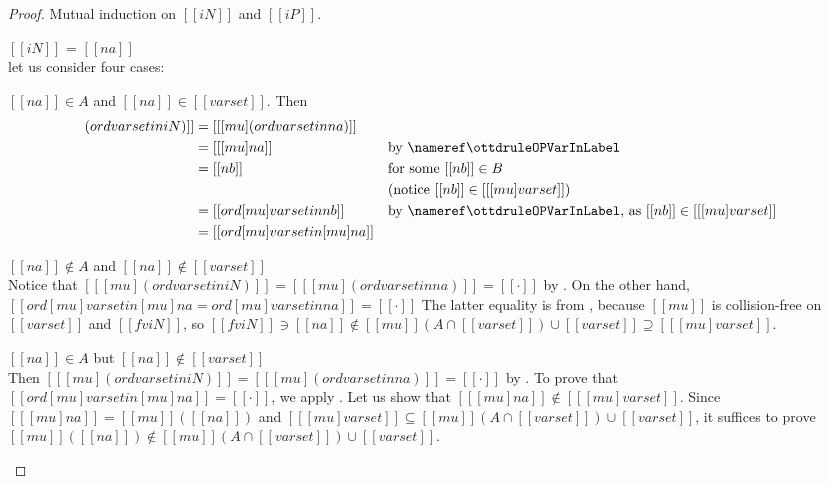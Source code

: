 \lemDistrMuOrd*
\begin{proof}
  Mutual induction on $[[iN]]$ and $[[iP]]$.
  \begin{caseof}
  \item $[[iN]]$ = $[[na]]$ \label{case:distr-mu-ord:var} \\
    let us consider four cases:
    \begin{caseof}
    \item $[[na]] \in A$ and $[[na]] \in [[varset]]$. Then
      \begin{align*} [[ [mu] (ord varset in iN) ]] &= [[ [mu] (ord varset in na)]] \\
                                                             &= [[ [mu] na ]]
                                                             && \text{by \ruleref{\ottdruleOPVarInLabel}}\\
                                                             &= [[nb]]
                                                             && \text{for some $[[nb]] \in B$}\\
                                                             & && \text{(notice $[[nb]] \in [[ [mu]varset ]]$)} \\
                                                             &= [[ ord [mu]varset in nb ]]
                                                             && \text{by \ruleref{\ottdruleOPVarInLabel},
                                                                as $[[nb]] \in [[ [mu]varset ]]$} \\
                                                             &= [[ord [mu] varset in [mu] na ]]
       \end{align*}
     \item $[[na]] \notin A$ and $[[na]] \notin [[varset]]$\\
       Notice that
       $[[ [mu] (ord varset in iN) ]] = [[ [mu] (ord varset in na)]] = [[·]]$ by
       .
       On the other hand, $[[ ord [mu] varset in [mu] na = ord [mu] varset
       in na ]] = [[·]]$ The latter equality is from
       , because
       $[[mu]]$ is collision-free on $[[varset]]$ and $[[fv iN]]$, so
       $[[fv iN]] \ni [[na]] \notin [[mu]](A \cap [[varset]]) \cup
       [[varset]] \supseteq [[ [mu] varset ]]$.
     \item $[[na]] \in A$ but $[[na]] \notin [[varset]]$\\ Then
       $[[ [mu] (ord varset in iN) ]] = [[ [mu] (ord varset in na)]] = [[·]]$
       by .
       To prove that\\ $[[ ord [mu] varset in [mu] na ]] = [[·]]$, we apply
       . Let us show that
       $[[ [mu] na ]] \notin [[ [mu] varset ]]$.
       Since $[[ [mu] na ]] = [[mu]]([[na]])$ and
       $[[ [mu] varset ]] \subseteq [[mu]](A \cap [[varset]]) \cup [[varset]]$,
       it suffices to prove 
       $[[mu]]([[na]]) \notin [[mu]](A \cap [[varset]]) \cup [[varset]]$.


\end{caseof}
\end{caseof}
\end{proof}
